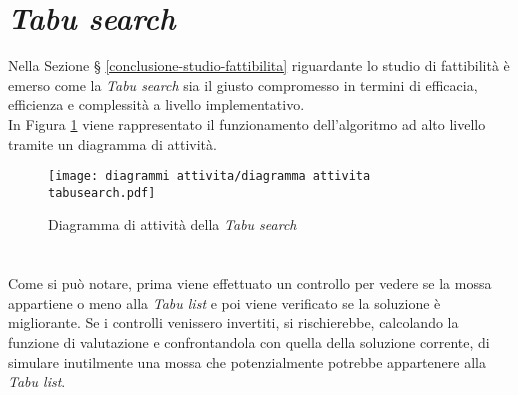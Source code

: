 \section{\textit{Tabu search}}
\label{sec:tabu-search}
\noindent Nella Sezione § \ref{conclusione-studio-fattibilita}
riguardante lo studio di fattibilità è emerso come la \textit{Tabu search}
sia il giusto compromesso in termini di efficacia, efficienza
e complessità a livello implementativo.\\
In Figura \ref{diagramma-attivita-tabu-search}
viene rappresentato il funzionamento dell'algoritmo ad alto livello tramite un diagramma di attività. \cite{site:rcardin}
\vspace*{\fill}
\begin{figure}[!h] 
    \centering 
    \texttt{[image: diagrammi attivita/diagramma attivita tabusearch.pdf]} 
    \caption{Diagramma di attività della \textit{Tabu search}}
    \label{diagramma-attivita-tabu-search}
\end{figure}
\noindent \paragraph{}\hfill\\
Come si può notare, prima viene effettuato un controllo per vedere se la mossa
appartiene o meno alla \textit{Tabu list} e poi viene verificato se la soluzione è migliorante.
Se i controlli venissero invertiti, si rischierebbe, calcolando
la funzione di valutazione e confrontandola con quella della soluzione corrente,
di simulare inutilmente una mossa che potenzialmente potrebbe appartenere alla \textit{Tabu list}.
\vspace*{\fill}

\newpage

